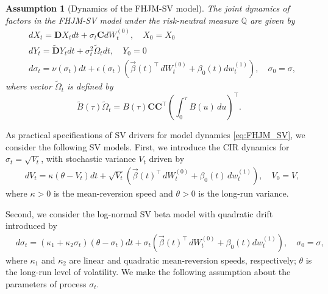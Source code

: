 \documentclass[pdftex,11pt,a4paper] {article}
\newtheorem{assumption}{Assumption}[section]
\begin{document}
\begin{assumption} [Dynamics of the FHJM-SV model] The joint dynamics of factors in the FHJM-SV model under the risk-neutral measure $\mathbb{Q}$ are given by 
\begin{equation}\label{eq:FHJM_SV}
\begin{split}
&   dX_{t} = \mathbf{D} X_{t}dt  + \sigma_t\mathbf{C}dW^{(0)}_{t},\quad X_0=X_0\\
& dY_{t} = \tilde{\mathbf{D}}Y_{t}dt +  \sigma_t^2\tilde \Omega_{t}dt,\quad  Y_0=0\\
&d\sigma_t=  \nu(\sigma_{t})dt +  \epsilon(\sigma_t)\left(\vec{\beta}(t)^\top\,dW^{(0)}_t + \beta_{0}(t)dw^{(1)}_t\right),\quad \sigma_0=\sigma,
\end{split}
\end{equation}
where vector $\tilde \Omega_{t}$ is defined by
\begin{equation}\label{eq:FHJM_Omega_SV}
\tilde B(\tau)\tilde\Omega_t=B(\tau)\mathbf{C}\mathbf{C}^\top \left(\int_0^\tau B(u)\,du\right)^\top.
\end{equation}
\end{assumption}



As practical specifications of SV drivers for model dynamics \eqref{eq:FHJM_SV}, we consider the following SV models. First, we introduce the CIR dynamics for $\sigma_{t}=\sqrt{V_{t}}$, with stochastic variance $V_{t}$ driven by
\begin{equation}\label{eq:mdh}
\begin{split}
&dV_{t}=\kappa\left(\theta-V_{t}\right)dt + \sqrt{V_{t}} \left(\vec{\beta}(t)^\top\,dW^{(0)}_t+\beta_{0}(t)\,dw^{(1)}_t\right),\quad V_0=V,
\end{split}
\end{equation}
where $\kappa>0$ is the mean-reversion speed and $\theta>0$ is the long-run variance.

Second, we consider the log-normal SV beta model with quadratic drift introduced by \cite{Sepp2024}
\begin{equation}\label{eq:md}
\begin{split}
&d\sigma_t=\left(\kappa_{1}+\kappa_{2}\sigma_t\right)(\theta-\sigma_t)dt + \sigma_t \left( \vec{\beta}(t)^\top\,dW^{(0)}_t+\beta_{0}(t)dw^{(1)}_t \right),\quad \sigma_0=\sigma,
\end{split}
\end{equation}
where $\kappa_{1}$ and $\kappa_{2}$ are linear and quadratic mean-reversion speeds, respectively; $\theta$ is the long-run level of volatility. 
We make the following assumption about the parameters of process $\sigma_t$. 
\end{document}

